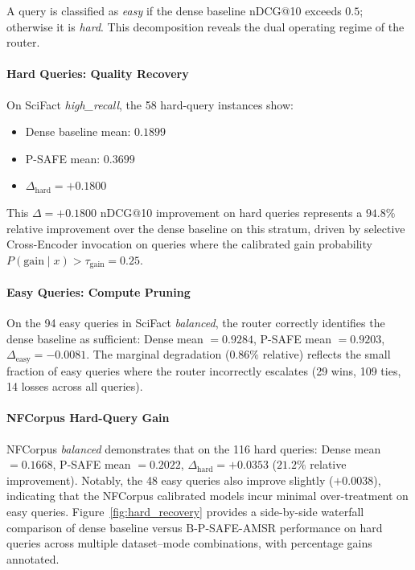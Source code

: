 \documentclass[journal]{IEEEtran}
\begin{document}
A query is classified as \emph{easy} if the dense baseline nDCG@10
exceeds $0.5$; otherwise it is \emph{hard}. This decomposition
reveals the dual operating regime of the router.

\paragraph{Hard Queries: Quality Recovery}
On SciFact \textit{high\_recall}, the 58 hard-query instances show:
\begin{itemize}
  \item Dense baseline mean: $0.1899$
  \item P-SAFE mean: $0.3699$
  \item $\Delta_{\text{hard}} = +0.1800$
\end{itemize}

This $\Delta = +0.1800$ nDCG@10 improvement on hard queries
represents a $94.8\%$ relative improvement over the dense
baseline on this stratum, driven by selective Cross-Encoder
invocation on queries where the calibrated gain probability
$P(\text{gain} \mid x) > \tau_{\text{gain}} = 0.25$.

\paragraph{Easy Queries: Compute Pruning}
On the 94 easy queries in SciFact \textit{balanced}, the router
correctly identifies the dense baseline as sufficient:
Dense mean $= 0.9284$, P-SAFE mean $= 0.9203$,
$\Delta_{\text{easy}} = -0.0081$.
The marginal degradation ($0.86\%$ relative) reflects the small
fraction of easy queries where the router incorrectly escalates
(29 wins, 109 ties, 14 losses across all queries).

\paragraph{NFCorpus Hard-Query Gain}
NFCorpus \textit{balanced} demonstrates that on the 116 hard
queries: Dense mean $= 0.1668$, P-SAFE mean $= 0.2022$,
$\Delta_{\text{hard}} = +0.0353$ ($21.2\%$ relative improvement).
Notably, the 48 easy queries also improve slightly ($+0.0038$),
indicating that the NFCorpus calibrated models incur minimal
over-treatment on easy queries.
Figure~\ref{fig:hard_recovery} provides a side-by-side waterfall
comparison of dense baseline versus B-P-SAFE-AMSR performance on
hard queries across multiple dataset--mode combinations, with
percentage gains annotated.
\end{document}
